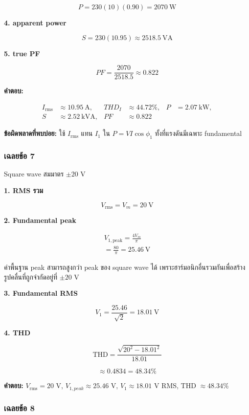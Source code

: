 \[
P=230(10)(0.90)=2070\ \text{W}
\]

\textbf{4. apparent power}

\[
S=230(10.95)\approx2518.5\ \text{VA}
\]

\textbf{5. true PF}

\[
PF=\frac{2070}{2518.5}\approx0.822
\]

\textbf{คำตอบ:}

\[
\boxed{
\begin{aligned}
    I_{\mathrm{rms}}&\approx10.95\ \text{A},&
    THD_I&\approx44.72\%,&
    P&=2.07\ \text{kW},\\
    S&\approx2.52\ \text{kVA},&
    PF&\approx0.822
\end{aligned}
}
\]

\textbf{ข้อผิดพลาดที่พบบ่อย:} ใช้ $I_{\mathrm{rms}}$ แทน $I_1$ ใน $P=VI\cos\phi_1$ ทั้งที่แรงดันมีเฉพาะ fundamental

\subsubsection{เฉลยข้อ 7}

Square wave สมมาตร $\pm20$ V

\textbf{1. RMS รวม}

\[
V_{\mathrm{rms}}=V_m=20\ \text{V}
\]

\textbf{2. Fundamental peak}

\[
\begin{aligned}
    V_{1,\mathrm{peak}}=\frac{4V_m}{\pi} \\
    =\frac{80}{\pi}=25.46\ \text{V}
\end{aligned}
\]

ค่าพื้นฐาน peak สามารถสูงกว่า peak ของ square wave ได้ เพราะฮาร์มอนิกอื่นรวมกันเพื่อสร้างรูปคลื่นที่ถูกจำกัดอยู่ที่ $\pm20$ V

\textbf{3. Fundamental RMS}

\[
V_1=\frac{25.46}{\sqrt2}=18.01\ \text{V}
\]

\textbf{4. THD}

\[
\mathrm{THD}=\frac{\sqrt{20^2-18.01^2}}{18.01}
\]

\[
\approx0.4834=48.34\%
\]

\textbf{คำตอบ:} $V_{\mathrm{rms}}=20$ V, $V_{1,peak}\approx25.46$ V, $V_1\approx18.01$ V RMS, THD $\approx48.34\%$

\subsubsection{เฉลยข้อ 8}

